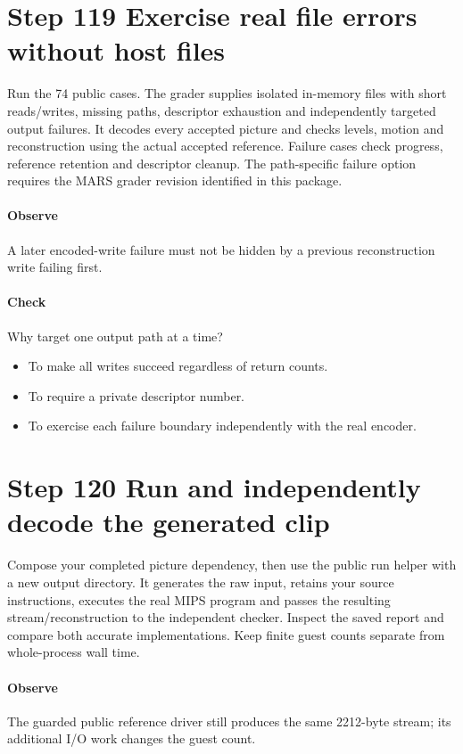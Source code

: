 \section{Step 119 Exercise real file errors without host files}\label{h263-clip-s09}
Run the 74 public cases. The grader supplies isolated in-memory files with short
reads/writes, missing paths, descriptor exhaustion and independently targeted
output failures. It decodes every accepted picture and checks levels, motion and
reconstruction using the actual accepted reference. Failure cases check progress,
reference retention and descriptor cleanup. The path-specific failure option
requires the MARS grader revision identified in this package.

\paragraph{Observe} A later encoded-write failure must not be hidden by a previous reconstruction write failing first.
\paragraph{Check} Why target one output path at a time?
\begin{itemize}
  \item[A.] To make all writes succeed regardless of return counts.
  \item[B.] To require a private descriptor number.
  \item[C.] To exercise each failure boundary independently with the real encoder.
\end{itemize}

\section{Step 120 Run and independently decode the generated clip}\label{h263-clip-s10}
Compose your completed picture dependency, then use the public run helper with
a new output directory. It generates the raw input, retains your source instructions,
executes the real MIPS program and passes the resulting stream/reconstruction to
the independent checker. Inspect the saved report and compare both accurate
implementations. Keep finite guest counts separate from whole-process wall time.

\paragraph{Observe} The guarded public reference driver still produces the same 2212-byte stream; its additional I/O work changes the guest count.

